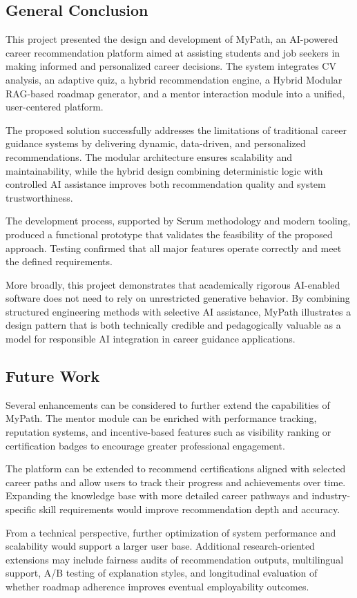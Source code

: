 \documentclass[12pt,a4paper]{article}
\begin{document}
\subsection{General Conclusion}

This project presented the design and development of MyPath, an AI-powered career recommendation platform aimed at assisting students and job seekers in making informed and personalized career decisions. The system integrates CV analysis, an adaptive quiz, a hybrid recommendation engine, a Hybrid Modular RAG-based roadmap generator, and a mentor interaction module into a unified, user-centered platform.

The proposed solution successfully addresses the limitations of traditional career guidance systems by delivering dynamic, data-driven, and personalized recommendations. The modular architecture ensures scalability and maintainability, while the hybrid design combining deterministic logic with controlled AI assistance improves both recommendation quality and system trustworthiness.

The development process, supported by Scrum methodology and modern tooling, produced a functional prototype that validates the feasibility of the proposed approach. Testing confirmed that all major features operate correctly and meet the defined requirements.

More broadly, this project demonstrates that academically rigorous AI-enabled software does not need to rely on unrestricted generative behavior. By combining structured engineering methods with selective AI assistance, MyPath illustrates a design pattern that is both technically credible and pedagogically valuable as a model for responsible AI integration in career guidance applications.

\subsection{Future Work}

Several enhancements can be considered to further extend the capabilities of MyPath. The mentor module can be enriched with performance tracking, reputation systems, and incentive-based features such as visibility ranking or certification badges to encourage greater professional engagement.

The platform can be extended to recommend certifications aligned with selected career paths and allow users to track their progress and achievements over time. Expanding the knowledge base with more detailed career pathways and industry-specific skill requirements would improve recommendation depth and accuracy.

From a technical perspective, further optimization of system performance and scalability would support a larger user base. Additional research-oriented extensions may include fairness audits of recommendation outputs, multilingual support, A/B testing of explanation styles, and longitudinal evaluation of whether roadmap adherence improves eventual employability outcomes.

\printbibliography
\end{document}
